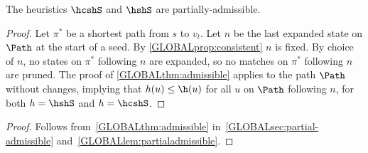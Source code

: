 \begin{lem}\label{GLOBALlem:partialadmissible}
  The heuristics $\hcshS$ and $\hshS$ are partially-admissible.
\end{lem}
\begin{proof}
  Let $\pi^*$ be a shortest path from $s$ to $v_t$. Let $n$ be the last
  expanded state on $\Path$ at the start of a seed.
  By \cref{GLOBALprop:consistent} $n$ is fixed.
  By choice of $n$, no states on $\pi^*$ following $n$ are expanded, so
  no matches on $\pi^*$ following $n$ are pruned.
  The proof of \cref{GLOBALthm:admissible} applies to the path $\Path$ without
  changes, implying that $h(u) \leq \h(u)$ for all $u$ on $\Path$ following
  $n$, for both $h=\hshS$ and $h=\hcshS$.
\end{proof}

\thmprunedcorrect*
\begin{proof}
Follows from~\cref{GLOBALthm:admissible} in~\cref{GLOBALsec:partial-admissible}
and~\cref{GLOBALlem:partialadmissible}.
\end{proof}

